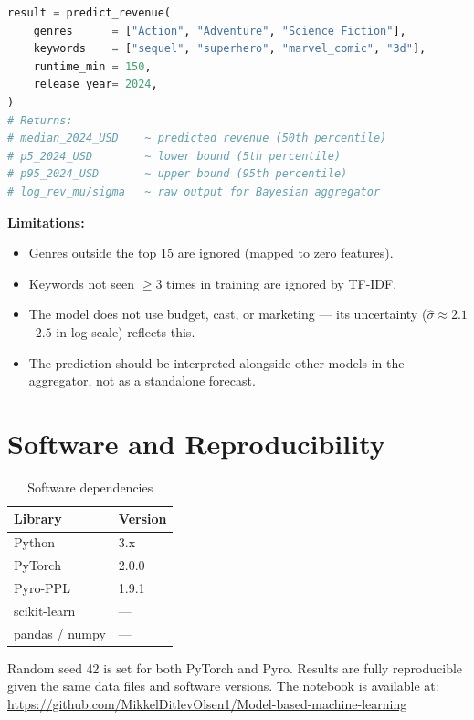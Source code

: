 \documentclass[12pt,a4paper]{article}
\begin{document}
\begin{lstlisting}[language=Python, caption=Prediction function usage]
result = predict_revenue(
    genres      = ["Action", "Adventure", "Science Fiction"],
    keywords    = ["sequel", "superhero", "marvel_comic", "3d"],
    runtime_min = 150,
    release_year= 2024,
)
# Returns:
# median_2024_USD    ~ predicted revenue (50th percentile)
# p5_2024_USD        ~ lower bound (5th percentile)
# p95_2024_USD       ~ upper bound (95th percentile)
# log_rev_mu/sigma   ~ raw output for Bayesian aggregator
\end{lstlisting}

\noindent\textbf{Limitations:}
\begin{itemize}
  \item Genres outside the top 15 are ignored (mapped to zero features).
  \item Keywords not seen $\geq 3$ times in training are ignored by TF-IDF.
  \item The model does not use budget, cast, or marketing — its uncertainty
        ($\hat{\sigma} \approx 2.1$--$2.5$ in log-scale) reflects this.
  \item The prediction should be interpreted alongside other models in the
        aggregator, not as a standalone forecast.
\end{itemize}

\section{Software and Reproducibility}

\begin{table}[H]
\centering
\begin{tabular}{ll}
\toprule
\textbf{Library} & \textbf{Version} \\
\midrule
Python   & 3.x \\
PyTorch  & 2.0.0 \\
Pyro-PPL & 1.9.1 \\
scikit-learn & --- \\
pandas / numpy & --- \\
\bottomrule
\end{tabular}
\caption{Software dependencies}
\end{table}

\noindent Random seed 42 is set for both PyTorch and Pyro. Results are fully
reproducible given the same data files and software versions.
The notebook is available at:
\url{https://github.com/MikkelDitlevOlsen1/Model-based-machine-learning}
\end{document}
